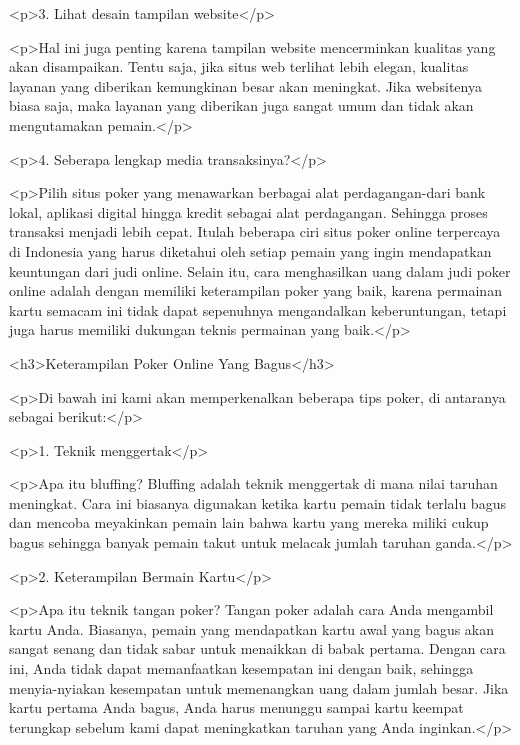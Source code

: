 <p>3. Lihat desain tampilan website</p>



<p>Hal ini juga penting karena tampilan website mencerminkan kualitas yang akan disampaikan. Tentu saja, jika situs web terlihat lebih elegan, kualitas layanan yang diberikan kemungkinan besar akan meningkat. Jika websitenya biasa saja, maka layanan yang diberikan juga sangat umum dan tidak akan mengutamakan pemain.</p>



<p>4. Seberapa lengkap media transaksinya?</p>



<p>Pilih situs poker yang menawarkan berbagai alat perdagangan-dari bank lokal, aplikasi digital hingga kredit sebagai alat perdagangan. Sehingga proses transaksi menjadi lebih cepat. Itulah beberapa ciri situs poker online terpercaya di Indonesia yang harus diketahui oleh setiap pemain yang ingin mendapatkan keuntungan dari judi online. Selain itu, cara menghasilkan uang dalam judi poker online adalah dengan memiliki keterampilan poker yang baik, karena permainan kartu semacam ini tidak dapat sepenuhnya mengandalkan keberuntungan, tetapi juga harus memiliki dukungan teknis permainan yang baik.</p>



<h3>Keterampilan Poker Online Yang Bagus</h3>



<p>Di bawah ini kami akan memperkenalkan beberapa tips poker, di antaranya sebagai berikut:</p>



<p>1. Teknik menggertak</p>



<p>Apa itu bluffing? Bluffing adalah teknik menggertak di mana nilai taruhan meningkat. Cara ini biasanya digunakan ketika kartu pemain tidak terlalu bagus dan mencoba meyakinkan pemain lain bahwa kartu yang mereka miliki cukup bagus sehingga banyak pemain takut untuk melacak jumlah taruhan ganda.</p>



<p>2. Keterampilan Bermain Kartu</p>



<p>Apa itu teknik tangan poker? Tangan poker adalah cara Anda mengambil kartu Anda. Biasanya, pemain yang mendapatkan kartu awal yang bagus akan sangat senang dan tidak sabar untuk menaikkan di babak pertama. Dengan cara ini, Anda tidak dapat memanfaatkan kesempatan ini dengan baik, sehingga menyia-nyiakan kesempatan untuk memenangkan uang dalam jumlah besar. Jika kartu pertama Anda bagus, Anda harus menunggu sampai kartu keempat terungkap sebelum kami dapat meningkatkan taruhan yang Anda inginkan.</p>



